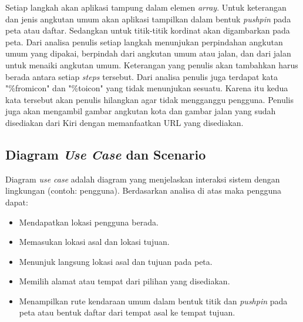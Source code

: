 Setiap langkah akan aplikasi tampung dalam elemen \textit{array}. Untuk keterangan dan jenis angkutan umum akan aplikasi tampilkan dalam bentuk \textit{pushpin} pada peta atau daftar. Sedangkan untuk titik-titik kordinat akan digambarkan pada peta. Dari analisa penulis setiap langkah menunjukan perpindahan angkutan umum yang dipakai, berpindah dari angkutan umum atau jalan, dan dari jalan untuk menaiki angkutan umum. Keterangan yang penulis akan tambahkan harus berada antara setiap \textit{steps} tersebut. Dari analisa penulis juga terdapat kata "\%fromicon" dan "\%toicon" yang tidak menunjukan sesuatu. Karena itu kedua kata tersebut akan penulis hilangkan agar tidak mengganggu pengguna. Penulis juga akan mengambil gambar angkutan kota dan gambar jalan yang sudah disediakan dari Kiri dengan memanfaatkan URL yang disediakan. 

\subsection{Diagram \textit{Use Case} dan Scenario}
\label{lab:Diagram Use-Case dan Scenario}
\hspace{0.5cm} Diagram \textit{use case} adalah diagram yang menjelaskan interaksi sistem dengan lingkungan (contoh: pengguna). Berdasarkan analisa di atas maka pengguna dapat:
\begin{itemize}
	\item Mendapatkan lokasi pengguna berada.
	\item Memasukan lokasi asal dan lokasi tujuan.
	\item Menunjuk langsung lokasi asal dan tujuan pada peta.
	\item Memilih alamat atau tempat dari pilihan yang disediakan.
	\item Menampilkan rute kendaraan umum dalam bentuk titik dan \textit{pushpin} pada peta atau bentuk daftar dari tempat asal ke tempat tujuan.
\end{itemize}

